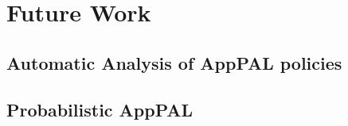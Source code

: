 \documentclass[thesis.tex]{subfiles}
\begin{document}
\chapter{Future Work}

\section{Automatic Analysis of AppPAL policies}
\label{sec:lint}

\section{Probabilistic AppPAL}
\end{document}
